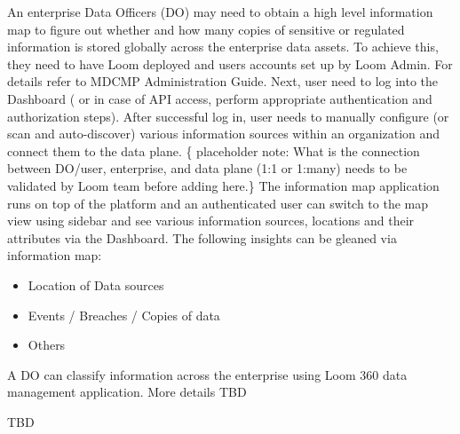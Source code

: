 \documentclass[letterpaper,10pt,english]{sphinxmanual}
\begin{document}
An enterprise Data Officers (DO) may need to obtain a high level information map to figure out whether and how many copies of sensitive or regulated information is stored globally across the enterprise data assets.  To achieve this, they need to have Loom deployed and users accounts set up by Loom Admin.  For details refer to MDCMP Administration Guide. Next, user need to log into the Dashboard ( or in case of API access, perform appropriate authentication and authorization steps).
After successful log in, user needs to manually configure (or scan and auto-discover) various information sources within an organization and connect them to the data plane.  \{ placeholder note: What is the connection between DO/user, enterprise, and data plane (1:1 or 1:many) \textendash{} needs to be validated by Loom team before adding here.\}  The information map application runs on top of the platform and an authenticated user can switch to the map view using sidebar and see various information sources, locations and their attributes via the Dashboard.  The following insights can be gleaned via information map:
\begin{itemize}
\item {} 
Location of Data sources

\item {} 
Events / Breaches / Copies of data

\item {} 
Others

\end{itemize}

A DO can classify information across the enterprise using Loom 360 data management application.  More details TBD

TBD
\end{document}
